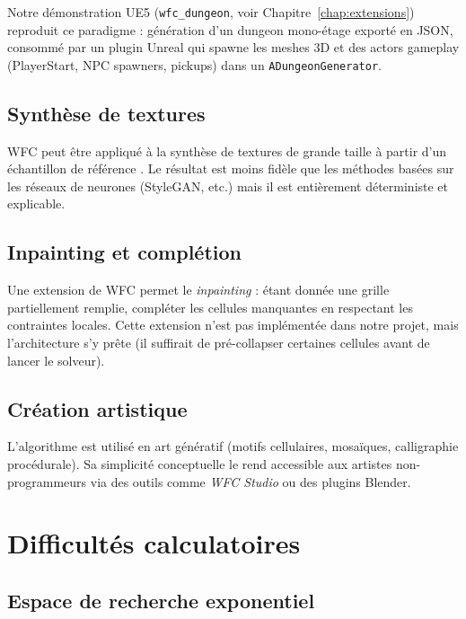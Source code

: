 Notre démonstration UE5 (\texttt{wfc\_dungeon}, voir Chapitre~\ref{chap:extensions}) reproduit ce paradigme : génération d'un dungeon mono-étage exporté en JSON, consommé par un plugin Unreal qui spawne les meshes 3D et des actors gameplay (PlayerStart, NPC spawners, pickups) dans un \texttt{ADungeonGenerator}.

\subsection{Synthèse de textures}

WFC peut être appliqué à la synthèse de textures de grande taille à partir d'un échantillon de référence \cite{efros1999texture}. Le résultat est moins fidèle que les méthodes basées sur les réseaux de neurones (StyleGAN, etc.) mais il est entièrement déterministe et explicable.

\subsection{Inpainting et complétion}

Une extension de WFC permet le \textit{inpainting} : étant donnée une grille partiellement remplie, compléter les cellules manquantes en respectant les contraintes locales. Cette extension n'est pas implémentée dans notre projet, mais l'architecture s'y prête (il suffirait de pré-collapser certaines cellules avant de lancer le solveur).

\subsection{Création artistique}

L'algorithme est utilisé en art génératif (motifs cellulaires, mosaïques, calligraphie procédurale). Sa simplicité conceptuelle le rend accessible aux artistes non-programmeurs via des outils comme \textit{WFC Studio} ou des plugins Blender.

\section{Difficultés calculatoires}
\label{sec:wfc:difficultes}

\subsection{Espace de recherche exponentiel}

